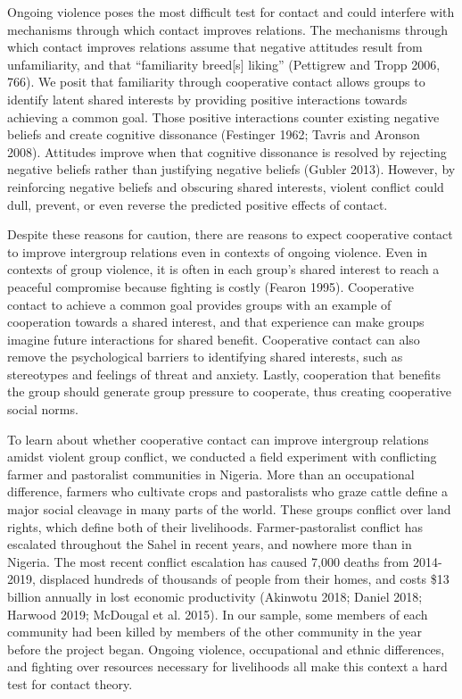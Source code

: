 \documentclass[11pt]{article}
\begin{document}
Ongoing violence poses the most difficult test for contact and could
interfere with mechanisms through which contact improves relations. The
mechanisms through which contact improves relations assume that negative
attitudes result from unfamiliarity, and that ``familiarity breed{[}s{]}
liking'' (Pettigrew and Tropp 2006, 766). We posit that familiarity
through cooperative contact allows groups to identify latent shared
interests by providing positive interactions towards achieving a common
goal. Those positive interactions counter existing negative beliefs and
create cognitive dissonance (Festinger 1962; Tavris and Aronson 2008).
Attitudes improve when that cognitive dissonance is resolved by
rejecting negative beliefs rather than justifying negative beliefs
(Gubler 2013). However, by reinforcing negative beliefs and obscuring
shared interests, violent conflict could dull, prevent, or even reverse
the predicted positive effects of contact.

Despite these reasons for caution, there are reasons to expect
cooperative contact to improve intergroup relations even in contexts of
ongoing violence. Even in contexts of group violence, it is often in
each group's shared interest to reach a peaceful compromise because
fighting is costly (Fearon 1995). Cooperative contact to achieve a
common goal provides groups with an example of cooperation towards a
shared interest, and that experience can make groups imagine future
interactions for shared benefit. Cooperative contact can also remove the
psychological barriers to identifying shared interests, such as
stereotypes and feelings of threat and anxiety. Lastly, cooperation that
benefits the group should generate group pressure to cooperate, thus
creating cooperative social norms.

To learn about whether cooperative contact can improve intergroup
relations amidst violent group conflict, we conducted a field experiment
with conflicting farmer and pastoralist communities in Nigeria. More
than an occupational difference, farmers who cultivate crops and
pastoralists who graze cattle define a major social cleavage in many
parts of the world. These groups conflict over land rights, which define
both of their livelihoods. Farmer-pastoralist conflict has escalated
throughout the Sahel in recent years, and nowhere more than in Nigeria.
The most recent conflict escalation has caused 7,000 deaths from
2014-2019, displaced hundreds of thousands of people from their homes,
and costs \$13 billion annually in lost economic productivity (Akinwotu
2018; Daniel 2018; Harwood 2019; McDougal et al. 2015). In our sample,
some members of each community had been killed by members of the other
community in the year before the project began. Ongoing violence,
occupational and ethnic differences, and fighting over resources
necessary for livelihoods all make this context a hard test for contact
theory.
\end{document}
